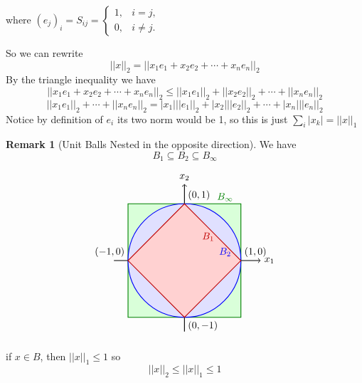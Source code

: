\documentclass[11pt]{article}
\newcommand{\1}{\mathbf{1}}
\theoremstyle{notestyle}
\theoremstyle{definition}
\newtheorem{remark}[theorem]{Remark}
\begin{document}
where $(e_j)_i = S_{ij} =
\begin{cases}
1, & i=j,\\
0, & i\ne j.
\end{cases}$
\par So we can rewrite $$||x||_2 = ||x_1e_1 + x_2 e_2 + \cdots + x_n e_n||_2$$
By the triangle inequality we have 
$$ ||x_1e_1 + x_2 e_2 + \cdots + x_n e_n||_2 \le ||x_1e_1||_2 + ||x_2e_2||_2 + \cdots +
||x_ne_n||_2$$
$$||x_1e_1||_2
+  \cdots + ||x_ne_n||_2 = |x_1|||e_1||_2 + |x_2|||e_2||_2 + \cdots + |x_n| ||e_n||_2$$
Notice by definition of $e_i$ its two norm would be 1, so this is just $\sum_{i} |x_k| =
||x||_1$
\begin{remark}[Unit Balls Nested in the opposite direction]
\label{rem:label}
We have $$B_1 \subseteq B_2 \subseteq B_{\infty}$$

\[
\begin{tikzpicture}[scale=2]

    \draw[->, thick] (-1.25,0) -- (1.35,0) node[right] {$x_1$};
    \draw[->, thick] (0,-1.25) -- (0,1.35) node[above] {$x_2$};

    \fill[green!15] (-1,-1) rectangle (1,1);
    \draw[thick, green!50!black] (-1,-1) rectangle (1,1);

    \fill[blue!12] (0,0) circle (1);
    \draw[thick, blue] (0,0) circle (1);

    \fill[red!18] 
        (1,0) -- (0,1) -- (-1,0) -- (0,-1) -- cycle;
    \draw[thick, red!75!black]
        (1,0) -- (0,1) -- (-1,0) -- (0,-1) -- cycle;

    \node[above right] at (1,0) {$(1,0)$};
    \node[above left] at (-1,0) {$(-1,0)$};
    \node[above right] at (0,1) {$(0,1)$};
    \node[below right] at (0,-1) {$(0,-1)$};

    \node[red!75!black] at (0.42,0.42) {$B_1$};
    \node[blue] at (0.72,0.15) {$B_2$};
    \node[green!50!black] at (0.72,1.12) {$B_\infty$};

\end{tikzpicture}
\]
\par if $x \in B$, then $||x||_1 \le 1$ so $$||x||_2 \le ||x||_1 \le 1$$
\end{remark}
\end{document}
